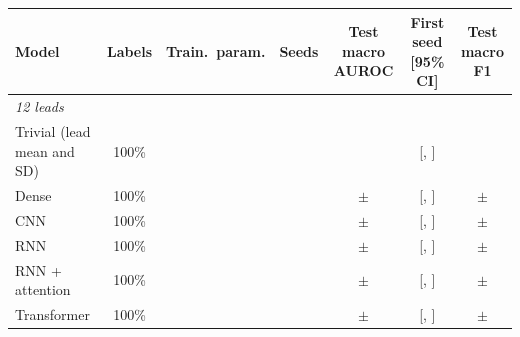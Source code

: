 \begin{tabular}{lcrrccc}
\toprule
Model & Labels & Train.\ param. & Seeds & Test macro AUROC & First seed [95\% CI] & Test macro F1 \\
\midrule
\multicolumn{7}{l}{\textit{12 leads}} \\
\quad Trivial (lead mean and SD) & 100\% & \comparisonParamsTrivial{} & \comparisonNSeedsTrivial{} & \comparisonTestAurocMeanTrivial{} & \comparisonTestAurocFirstTrivial{} [\comparisonTestAurocLoFirstTrivial{}, \comparisonTestAurocHiFirstTrivial{}] & \comparisonTestFOneMeanTrivial{} \\
\quad Dense & 100\% & \comparisonParamsTwelveDense{} & \comparisonNSeedsTwelveDense{} & \comparisonTestAurocMeanTwelveDense{} $\pm$ \comparisonTestAurocSdTwelveDense{} & \comparisonTestAurocFirstTwelveDense{} [\comparisonTestAurocLoFirstTwelveDense{}, \comparisonTestAurocHiFirstTwelveDense{}] & \comparisonTestFOneMeanTwelveDense{} $\pm$ \comparisonTestFOneSdTwelveDense{} \\
\quad CNN & 100\% & \comparisonParamsTwelveCnn{} & \comparisonNSeedsTwelveCnn{} & \comparisonTestAurocMeanTwelveCnn{} $\pm$ \comparisonTestAurocSdTwelveCnn{} & \comparisonTestAurocFirstTwelveCnn{} [\comparisonTestAurocLoFirstTwelveCnn{}, \comparisonTestAurocHiFirstTwelveCnn{}] & \comparisonTestFOneMeanTwelveCnn{} $\pm$ \comparisonTestFOneSdTwelveCnn{} \\
\quad RNN & 100\% & \comparisonParamsTwelveRnn{} & \comparisonNSeedsTwelveRnn{} & \comparisonTestAurocMeanTwelveRnn{} $\pm$ \comparisonTestAurocSdTwelveRnn{} & \comparisonTestAurocFirstTwelveRnn{} [\comparisonTestAurocLoFirstTwelveRnn{}, \comparisonTestAurocHiFirstTwelveRnn{}] & \comparisonTestFOneMeanTwelveRnn{} $\pm$ \comparisonTestFOneSdTwelveRnn{} \\
\quad RNN + attention & 100\% & \comparisonParamsTwelveRnnattn{} & \comparisonNSeedsTwelveRnnattn{} & \comparisonTestAurocMeanTwelveRnnattn{} $\pm$ \comparisonTestAurocSdTwelveRnnattn{} & \comparisonTestAurocFirstTwelveRnnattn{} [\comparisonTestAurocLoFirstTwelveRnnattn{}, \comparisonTestAurocHiFirstTwelveRnnattn{}] & \comparisonTestFOneMeanTwelveRnnattn{} $\pm$ \comparisonTestFOneSdTwelveRnnattn{} \\
\quad Transformer & 100\% & \comparisonParamsTwelveTransformer{} & \comparisonNSeedsTwelveTransformer{} & \comparisonTestAurocMeanTwelveTransformer{} $\pm$ \comparisonTestAurocSdTwelveTransformer{} & \comparisonTestAurocFirstTwelveTransformer{} [\comparisonTestAurocLoFirstTwelveTransformer{}, \comparisonTestAurocHiFirstTwelveTransformer{}] & \comparisonTestFOneMeanTwelveTransformer{} $\pm$ \comparisonTestFOneSdTwelveTransformer{} \\

\end{tabular}
